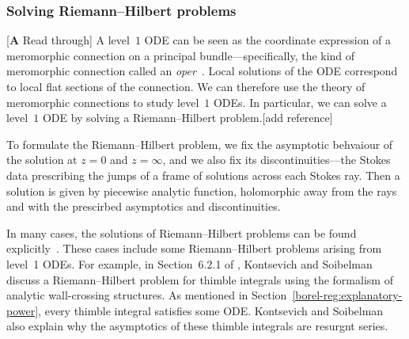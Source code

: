 \documentclass{article}
\theoremstyle{definition}
\theoremstyle{plain}
\newenvironment{todo}{\color{Coral}}{\color{black}}
\newenvironment{draft}{\color{SlateBlue}}{\color{black}}
\newenvironment{revised}{\color{DarkBlue}}{\color{black}}
\begin{document}
\subsubsection{Solving Riemann--Hilbert problems}
\begin{todo}[\textbf{A} Read through]\end{todo} \begin{revised}A level~$1$ ODE can be seen as the coordinate expression of a meromorphic connection on a principal bundle---specifically, the kind of meromorphic connection called an {\em oper}~\cite{BD-opers}. Local solutions of the ODE correspond to local flat sections of the connection. We can therefore use the theory of meromorphic connections to study level~$1$ ODEs. In particular, we can solve a level~$1$ ODE by solving a Riemann--Hilbert problem.\begin{todo}[add reference]\end{todo}

To formulate the Riemann--Hilbert problem, we fix the asymptotic behvaiour of the solution at $z = 0$ and $z = \infty$,\end{revised} and we also fix its discontinuities---the Stokes data prescribing the jumps of a frame of solutions across each Stokes ray. Then a solution is given by piecewise analytic function, holomorphic away from the rays and with the prescirbed asymptotics and discontinuities. 

In many cases, the solutions of Riemann--Hilbert problems can be found explicitly~\cite{Dubrovin-tt_star,Dubrovin-Heun,GMN1,Tom-RH-1,Tom-RH-conifold,BBS-RH}. \begin{draft}These cases include some Riemann--Hilbert problems arising from level~1 ODEs.\end{draft} For example, in Section~6.2.1 of \cite{kontsevich2022analyticity}, Kontsevich and Soibelman discuss a Riemann--Hilbert problem for thimble integrals using the formalism of analytic wall-crossing structures. As mentioned in Section~\ref{borel-reg:explanatory-power}, every thimble integral satisfies some ODE. Kontsevich and Soibelman also explain why the asymptotics of these thimble integrals are resurgnt series.
\end{document}
